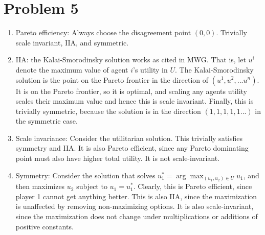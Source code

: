 \documentclass[10pt,letter]{article}
\begin{document}
\section*{Problem 5}
\begin{enumerate}[label=(\alph*)]
\item Pareto efficiency: Always choose the disagreement point $(0,0)$. Trivially scale invariant, IIA, and symmetric.
\item IIA: the Kalai-Smorodinsky solution works as cited in MWG. That is, let $u^i$ denote the maximum value of agent $i$'s utility in $U$. The Kalai-Smorodinsky solution is the point on the Pareto frontier in the direction of $(u^1, u^2, ... u^n)$. It is on the Pareto frontier, so it is optimal, and scaling any agents utility scales their maximum value and hence this is scale invariant. Finally, this is trivially symmetric, because the solution is in the direction $(1,1,1,1,1...)$ in the symmetric case.
\item Scale invariance: Consider the utilitarian solution. This trivially satisfies symmetry and IIA. It is also Pareto efficient, since any Pareto dominating point must also have higher total utility. It is not scale-invariant.
\item Symmetry: Consider the solution that solves $u_1^* = \arg\max_{(u_1, u_2) \in U} u_1$, and then maximizes $u_2$ subject to $u_1 = u_1^*$. Clearly, this is Pareto efficient, since player 1 cannot get anything better. This is also IIA, since the maximization is unaffected by removing non-mazimizing options. It is also scale-invariant, since the maximization does not change under multiplications or additions of positive constants.
\end{enumerate}
\end{document}
